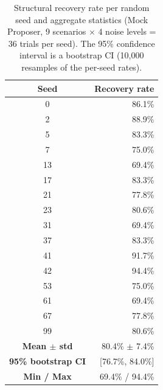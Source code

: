 \begin{table}[H]
\centering
\caption{Structural recovery rate per random seed and aggregate statistics (Mock Proposer, 9 scenarios $\times$ 4 noise levels = 36 trials per seed). The 95\% confidence interval is a bootstrap CI (10{,}000 resamples of the per-seed rates).}
\label{tab:multi_seed}
\small
\begin{tabular}{c r}
\toprule
\textbf{Seed} & \textbf{Recovery rate} \\
\midrule
0 & 86.1\% \\
2 & 88.9\% \\
5 & 83.3\% \\
7 & 75.0\% \\
13 & 69.4\% \\
17 & 83.3\% \\
21 & 77.8\% \\
23 & 80.6\% \\
31 & 69.4\% \\
37 & 83.3\% \\
41 & 91.7\% \\
42 & 94.4\% \\
53 & 75.0\% \\
61 & 69.4\% \\
67 & 77.8\% \\
99 & 80.6\% \\
\midrule
\textbf{Mean $\pm$ std} & 80.4\% $\pm$ 7.4\% \\
\textbf{95\% bootstrap CI} & [76.7\%, 84.0\%] \\
\textbf{Min / Max} & 69.4\% / 94.4\% \\
\bottomrule
\end{tabular}
\end{table}